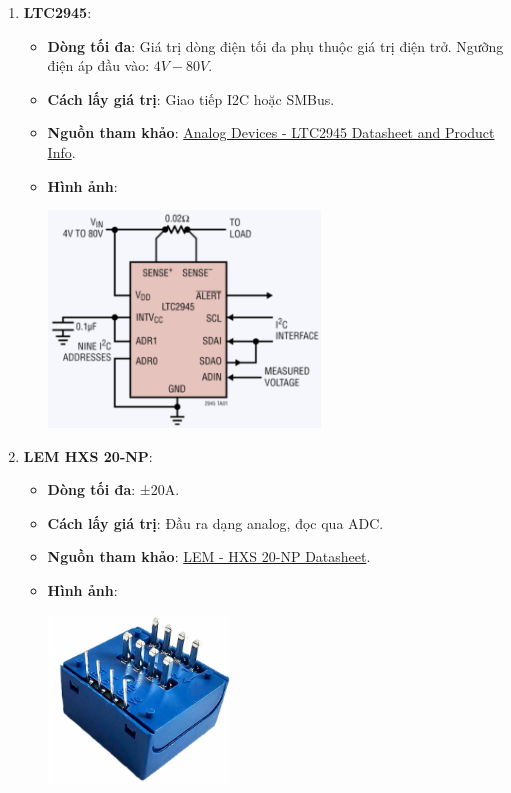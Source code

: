 \begin{enumerate}
    \item \textbf{LTC2945}:
    \begin{itemize}
        \item \textbf{Dòng tối đa}: Giá trị dòng điện tối đa phụ thuộc giá trị điện trở. Ngưỡng điện áp đầu vào: $4V - 80V$.
        \item \textbf{Cách lấy giá trị}: Giao tiếp I2C hoặc SMBus.
        \item \textbf{Nguồn tham khảo}: \href{https://www.analog.com/en/products/ltc2945.html}{Analog Devices - LTC2945 Datasheet and Product Info}.
        \item \textbf{Hình ảnh}:
        \begin{center}
            \includegraphics[width=0.6\textwidth]{graphics/section5/ltc2945.png}
        \end{center}
    \end{itemize}

    \item \textbf{LEM HXS 20-NP}:
    \begin{itemize}
        \item \textbf{Dòng tối đa}: ±20A.
        \item \textbf{Cách lấy giá trị}: Đầu ra dạng analog, đọc qua ADC.
        \item \textbf{Nguồn tham khảo}: \href{https://www.lem.com/sites/default/files/products_datasheets/hxs_20-np.pdf}{LEM - HXS 20-NP Datasheet}.
        \item \textbf{Hình ảnh}:
        \begin{center}
            \includegraphics[width=0.4\textwidth]{graphics/section5/lem_hxs20np.png}
        \end{center}
    \end{itemize}


\end{enumerate}
